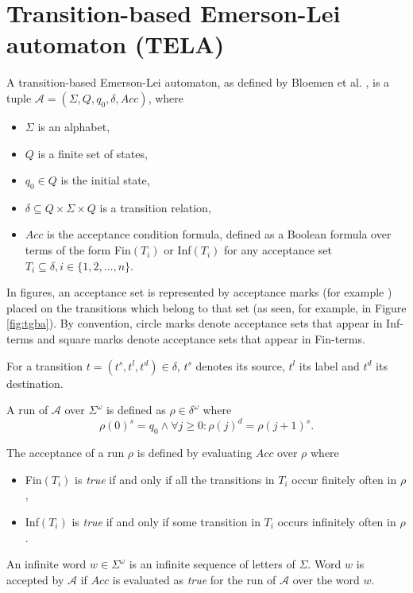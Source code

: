\documentclass[
  digital, %
  twoside, %
  table,   %
  lof,     %
  lot,     %
]{fithesis3}
\begin{document}
\section{Transition-based Emerson-Lei automaton (TELA)} 
\label{sec:tela}
A transition-based Emerson-Lei automaton, as defined by Bloemen et al. \cite{bloemen2017}, is a tuple $\mathcal{A} = (\Sigma, Q, q_0, \delta, Acc)$, where
\begin{itemize}
  \item $\Sigma$ is an alphabet,
  \item $Q$ is a finite set of states,
  \item $q_0 \in Q$ is the initial state,
  \item $\delta \subseteq Q \times \Sigma \times Q$ is a transition relation,
  \item $Acc$ is the acceptance condition formula, defined as a Boolean formula over terms of the form Fin$(T_i)$ or Inf$(T_i)$ for any acceptance set $T_i \subseteq \delta, i \in \{1, 2, \dots, n\}$. 
\end{itemize}

In figures, an acceptance set is represented by acceptance marks (for example \accmarkblue) placed on the transitions which belong to that set (as seen, for example, in Figure \ref{fig:tgba}). By convention, circle marks denote acceptance sets that appear in Inf-terms and square marks denote acceptance sets that appear in Fin-terms.

For a transition $t = (t^s, t^l, t^d) \in \delta$, $t^s$ denotes its source, $t^l$ its label and $t^d$ its destination.

A run of $\mathcal{A}$ over $\Sigma^\omega$ is defined as $\rho \in \delta^\omega$ where 
\begin{equation*}
  \rho(0)^s = q_0 \wedge \forall j \geq 0 \colon \rho(j)^d = \rho(j + 1)^s.
\end{equation*}

The acceptance of a run $\rho$ is defined by evaluating $Acc$ over $\rho$ where
\begin{itemize}
  \item Fin$(T_i)$ is \emph{true} if and only if all the transitions in $T_i$ occur finitely often in $\rho$, 
  \item Inf$(T_i)$ is \emph{true} if and only if some transition in $T_i$ occurs infinitely often in $\rho$.
\end{itemize}

An infinite word $w \in \Sigma^\omega$ is an infinite sequence of letters of $\Sigma$. Word $w$ is accepted by $\mathcal{A}$ if $Acc$ is evaluated as \emph{true} for the run of $\mathcal{A}$ over the word $w$. 
\end{document}
